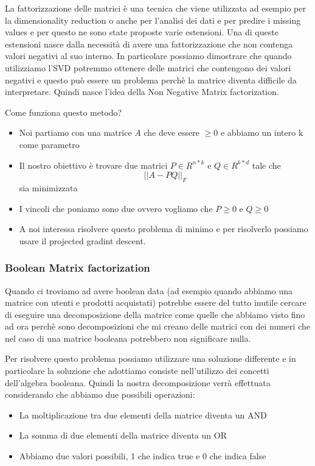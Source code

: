 \documentclass[14pt]{extreport}
\begin{document}
La fattorizzazione delle matrici è una tecnica che viene utilizzata ad esempio per la dimensionality reduction 
o anche per l'analisi dei dati e per predire i missing values e per questo ne sono state proposte varie estensioni.
Una di queste estensioni nasce dalla necessità di avere una fattorizzazione che non contenga valori negativi al suo interno.
In particolare possiamo dimostrare che quando utilizziamo l'SVD potremmo ottenere delle matrici che contengono dei valori negativi e questo può essere un problema
perchè la matrice diventa difficile da interpretare. Quindi nasce l'idea della Non Negative Matrix factorization.

Come funziona questo metodo?

\begin{itemize}
\item Noi partiamo con una matrice $A$ che deve essere $\geq 0$ e abbiamo un intero k come parametro 
\item Il nostro obiettivo è trovare due matrici $P \in R^{n*k}$ e $Q \in R^{k*d}$ tale che $$||A - PQ||_F$$ sia minimizzata 
\item I vincoli che poniamo sono due ovvero vogliamo che $P \geq 0$ e  $Q \geq 0$
\item A noi interessa risolvere questo problema di minimo e per risolverlo possiamo usare il projected gradint descent.
\end{itemize}


\subsubsection{Boolean Matrix factorization}

Quando ci troviamo ad avere boolean data (ad esempio quando abbiamo una matrice con utenti e prodotti acquistati) potrebbe essere del tutto inutile 
cercare di eseguire una decomposizione della matrice come quelle che abbiamo visto fino ad ora perchè sono decomposizioni che mi creano delle matrici con 
dei numeri che nel caso di una matrice booleana potrebbero non significare nulla.

Per risolvere questo problema possiamo utilizzare una soluzione differente e in particolare la soluzione che adottiamo consiste nell'utilizzo dei concetti
dell'algebra booleana.
Quindi la nostra decomposizione verrà effettuata considerando che abbiamo due possibili operazioni:
\begin{itemize}
\item La moltiplicazione tra due elementi della matrice diventa un AND 
\item La somma di due elementi della matrice diventa un OR
\item Abbiamo due valori possibili, 1 che indica true e 0 che indica false
\end{itemize}
\end{document}
